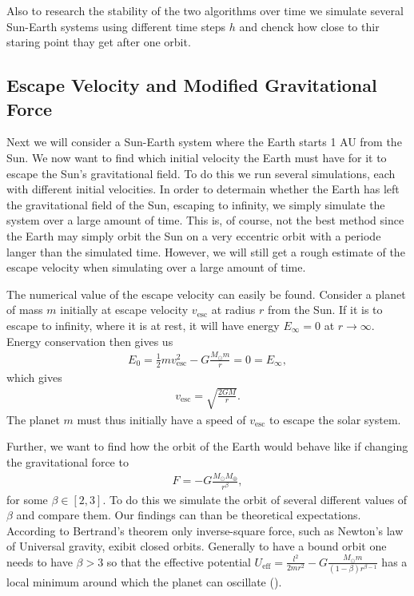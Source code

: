 \documentclass[twocolumn]{aastex62}
\begin{document}
Also to research the stability of the two algorithms over
time we simulate several Sun-Earth systems using different time steps $h$ and
chenck how close to thir staring point thay get after one orbit. 

\subsection{Escape Velocity and Modified Gravitational Force}\label{sec:modgrav}
Next we will consider a Sun-Earth system where the Earth starts 1 AU from the
Sun. We now want to find which initial velocity the Earth must have for it to
escape the Sun's gravitational field. To do this we run several simulations,
each with different initial velocities. In order to determain whether the Earth
has left the gravitational field of the Sun, escaping to infinity, we simply
simulate the system over a large amount of time. This is, of course, not the
best method since the Earth may simply orbit the Sun on a very eccentric orbit
with a periode langer than the simulated time. However, we will still get a
rough estimate of the escape velocity when simulating over a large amount of time.

The numerical value of the escape velocity can easily be found. Consider a
planet of mass $m$ initially at escape velocity $v_\mathrm{esc}$ at radius $r$
from the Sun. If it is to escape to infinity, where it is at rest, it will have
energy $E_\infty = 0$ at $r\to\infty$. Energy conservation then gives us 
\begin{align}
    E_0 = \frac{1}{2}mv_\mathrm{esc}^2 - G\frac{M_\odot m}{r} = 0 = E_\infty,
\end{align} 
which gives 
\begin{align}\label{eq:v_esc}
    v_\mathrm{esc} = \sqrt{\frac{2GM}{r}}.
\end{align}
The planet $m$ must thus initially have a speed of $v_\mathrm{esc}$ to escape the solar system.

Further, we want to find how the orbit of the Earth would behave like if
changing the gravitational force to 
\begin{align}
    F = -G\frac{M_\odot M_\oplus}{r^\beta},
\end{align}
for some $\beta\in[2, 3]$. To do this we simulate the orbit of several different
values of $\beta$ and compare them. Our findings can than be theoretical
expectations. According to Bertrand's theorem \citep[ch. 3.6]{goldstein:2001}
only inverse-square force, such as Newton's law of Universal gravity,
exibit closed orbits. Generally to have a bound orbit one needs to have $\beta >
3$ so
that the effective potential $U_\mathrm{eff} = \frac{l^2}{2mr^2} -
G\frac{M_\odot m}{(1-\beta)r^{\beta - 1}}$ has a local minimum around which the
planet can oscillate (\cite{ray:2004}).
\end{document}
